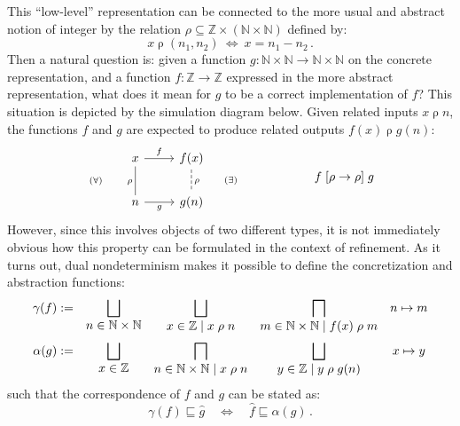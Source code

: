\documentclass[11pt,oneside]{book}
\theoremstyle{definition}
\newcommand{\ifr}[1]{\mathrel{[{#1}]}}
\newcommand{\refby}{\sqsubseteq} %
\begin{document}
This ``low-level'' representation can be connected
to the more usual and abstract notion of integer
by the relation
$\rho \subseteq \mathbb{Z} \times (\mathbb{N} \times \mathbb{N})$
defined by:
\[
  x \mathrel{\rho} (n_1, n_2)
  \: \Leftrightarrow \:
  x = n_1 - n_2
  \,.
\]
Then a natural question is:
given a function
$g : \mathbb{N} \times \mathbb{N} \rightarrow
     \mathbb{N} \times \mathbb{N}$
on the concrete representation,
and a function
$f : \mathbb{Z} \rightarrow \mathbb{Z}$
expressed in the more abstract representation,
what does it mean for $g$ to be a correct implementation of $f$?
This situation is depicted by the simulation diagram below.
Given related inputs $x \mathrel{\rho} n$,
the functions $f$ and $g$ are expected to produce
related outputs $f(x) \mathrel{\rho} g(n)$:
\[
  \begin{tikzcd}
    x \ar[r, "f"] \ar[d, "(\forall) \qquad \rho"', dash] &
    f(x) \ar[d, "\rho \qquad (\exists)", dash, dashed] \\
    n \ar[r, "g"'] &
    g(n)
  \end{tikzcd}
  \qquad \qquad \qquad
  f \ifr{\rho \rightarrow \rho} g
\]
However,
since this involves objects of two different types,
it is not immediately obvious how this property can be formulated
in the context of refinement.
As it turns out, dual nondeterminism makes it possible to define
the concretization and abstraction functions:
\[
  \begin{array}{rcccc}
    \gamma(f) := &
      \displaystyle
      \bigsqcup_{\mbox{$n \in \mathbb{N} \times \mathbb{N}$}} &
      \displaystyle
      \bigsqcup_{\mbox{$x \in \mathbb{Z} \mid x \mathrel{\rho} n$}} &
      \displaystyle
      \bigsqcap_{\mbox{$m \in \mathbb{N} \times \mathbb{N} \mid
                 f(x) \mathrel{\rho} m$}} &
      n \mapsto m
    \vspace{0.6em}
    \\
    \alpha(g) := &
      \displaystyle
      \bigsqcup_{\mbox{$x \in \mathbb{Z}$}} &
      \displaystyle
      \bigsqcap_{\mbox{$n \in \mathbb{N} \times \mathbb{N} \mid
        x \mathrel{\rho} n$}} &
      \displaystyle
      \bigsqcup_{\mbox{$y \in \mathbb{Z} \mid
        y \mathrel{\rho} g(n)$}} &
      x \mapsto y
  \end{array}
\]
such that the correspondence of $f$ and $g$ can be stated as:
\[
  \gamma(f) \sqsubseteq \hat{g}
  \quad \Leftrightarrow \quad
  \hat{f} \refby \alpha(g)
  \,.
\]


\end{document}
